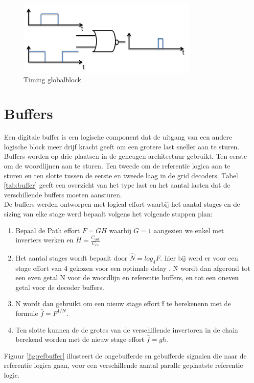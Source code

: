 \begin{figure}[!ht]
  \centering
  \includegraphics[width=0.8\textwidth]{../fig/hfdst-decoders-glitch.png}
  \caption{Timing globalblock}
  \label{fig:decoder_glitch}
\end{figure}


\section{Buffers}
Een digitale buffer is een logische component dat de uitgang van een andere logische block meer drijf kracht geeft om een grotere last sneller aan te sturen. Buffers worden op drie plaatsen in de geheugen architectuur gebruikt. Ten eerste om de woordlijnen aan te sturen. Ten tweede om de referentie logica aan te sturen en ten slotte  tussen de eerste en tweede laag in de grid decoders. Tabel \ref{tab:buffer} geeft een overzicht van het type last en het aantal lasten dat de verschillende buffers moeten aansturen.\\
De buffers werden ontworpen met logical effort waarbij het aantal stages en de sizing van elke stage werd bepaalt volgens het volgende stappen plan:
\begin{enumerate}
\item Bepaal de Path effort $F = GH$ waarbij $G = 1$ aangezien we enkel met inverters werken en $H = \frac{C_{out}}{C_{in}}$
\item Het aantal stages wordt bepaalt door $\hat{N} = log_{4}F$. hier bij werd er voor een stage effort van 4 gekozen voor een optimale delay \cite{Sutherland:1999:LED:298513}. \^{N} wordt dan afgerond tot een even getal N voor de woordlijn en referentie buffers, en tot een oneven getal voor de decoder buffers.
\item N wordt dan gebruikt om een nieuw stage effort \^{f} te berekenenn met de formule $\hat{f} = F^{1/N}$.
\item Ten slotte kunnen de de grotes van de verschillende invertoren in de chain berekend worden met de nieuw stage effort $\hat{f} = gh$.
\end{enumerate}
Figuur \ref{fig:refbuffer} illusteert de ongebufferde en gebufferde signalen die naar de referentie logica gaan, voor een verschillende aantal paralle geplaatste referentie logic.

